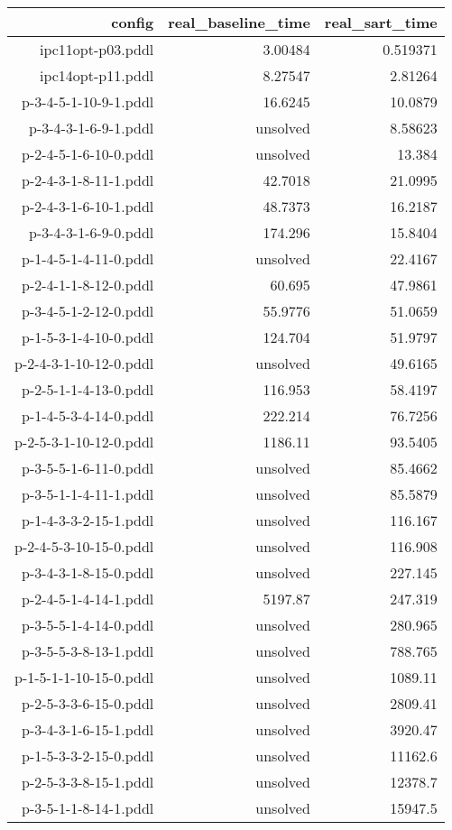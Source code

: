 \documentclass{article}
\begin{document}
                            \begin{center}
                            \scriptsize
                            \begin{tabular}{r|r|r}
                            config & real\_baseline\_time & real\_sart\_time\\\midrule
                             ipc11opt-p03.pddl&3.00484&0.519371\\
 ipc14opt-p11.pddl&8.27547&2.81264\\
 p-3-4-5-1-10-9-1.pddl&16.6245&10.0879\\
 p-3-4-3-1-6-9-1.pddl&unsolved&8.58623\\
 p-2-4-5-1-6-10-0.pddl&unsolved&13.384\\
 p-2-4-3-1-8-11-1.pddl&42.7018&21.0995\\
 p-2-4-3-1-6-10-1.pddl&48.7373&16.2187\\
 p-3-4-3-1-6-9-0.pddl&174.296&15.8404\\
 p-1-4-5-1-4-11-0.pddl&unsolved&22.4167\\
 p-2-4-1-1-8-12-0.pddl&60.695&47.9861\\
 p-3-4-5-1-2-12-0.pddl&55.9776&51.0659\\
 p-1-5-3-1-4-10-0.pddl&124.704&51.9797\\
 p-2-4-3-1-10-12-0.pddl&unsolved&49.6165\\
 p-2-5-1-1-4-13-0.pddl&116.953&58.4197\\
 p-1-4-5-3-4-14-0.pddl&222.214&76.7256\\
 p-2-5-3-1-10-12-0.pddl&1186.11&93.5405\\
 p-3-5-5-1-6-11-0.pddl&unsolved&85.4662\\
 p-3-5-1-1-4-11-1.pddl&unsolved&85.5879\\
 p-1-4-3-3-2-15-1.pddl&unsolved&116.167\\
 p-2-4-5-3-10-15-0.pddl&unsolved&116.908\\
 p-3-4-3-1-8-15-0.pddl&unsolved&227.145\\
 p-2-4-5-1-4-14-1.pddl&5197.87&247.319\\
 p-3-5-5-1-4-14-0.pddl&unsolved&280.965\\
 p-3-5-5-3-8-13-1.pddl&unsolved&788.765\\
 p-1-5-1-1-10-15-0.pddl&unsolved&1089.11\\
 p-2-5-3-3-6-15-0.pddl&unsolved&2809.41\\
 p-3-4-3-1-6-15-1.pddl&unsolved&3920.47\\
 p-1-5-3-3-2-15-0.pddl&unsolved&11162.6\\
 p-2-5-3-3-8-15-1.pddl&unsolved&12378.7\\
 p-3-5-1-1-8-14-1.pddl&unsolved&15947.5
                            \end{tabular}
                            \end{center}
                    
\end{document}
